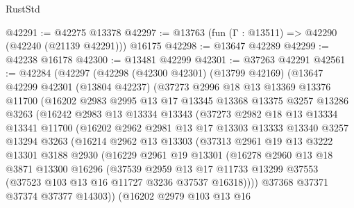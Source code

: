 \begin{lexlean}{RustStd}
\begin{coremodule}
@42291 := @42275 @13378
@42297 := @13763 (fun (Γ : @13511) => @42290 (@42240 (@21139 @42291))) @16175
@42298 := @13647 @42289
@42299 := @42238 @16178
@42300 := @13481 @42299
@42301 := @37263 @42291
@42561 := @42284
    (@42297
      (@42298
        (@42300 @42301)
        (@13799 @42169)
        (@13647
          @42299
          @42301
          (@13804 @42237)
          (@37273
            @2996
            @18
            @13
            @13369
            @13376
            @11700
            (@16202
              @2983
              @2995
              @13
              @17
              @13345
              @13368
              @13375
              @3257
              @13286
              @3263
              (@16242
                @2983
                @13
                @13334
                @13343
                (@37273
                  @2982
                  @18
                  @13
                  @13334
                  @13341
                  @11700
                  (@16202
                    @2962
                    @2981
                    @13
                    @17
                    @13303
                    @13333
                    @13340
                    @3257
                    @13294
                    @3263
                    (@16214
                      @2962
                      @13
                      @13303
                      (@37313
                        @2961
                        @19
                        @13
                        @3222
                        @13301
                        @3188
                        @2930
                        (@16229
                          @2961
                          @19
                          @13301
                          (@16278
                            @2960
                            @13
                            @18
                            @3871
                            @13300
                            @16296
                            (@37539
                              @2959
                              @13
                              @17
                              @11733
                              @13299
                              @37553
                              (@37523 @103 @13 @16 @11727 @3236 @37537 @16318))))
                        @37368
                        @37371
                        @37374
                        @37377
                        @14303))
                    (@16202
                      @2979
                      @103
                      @13
                      @16

\end{coremodule}
\end{lexlean}
